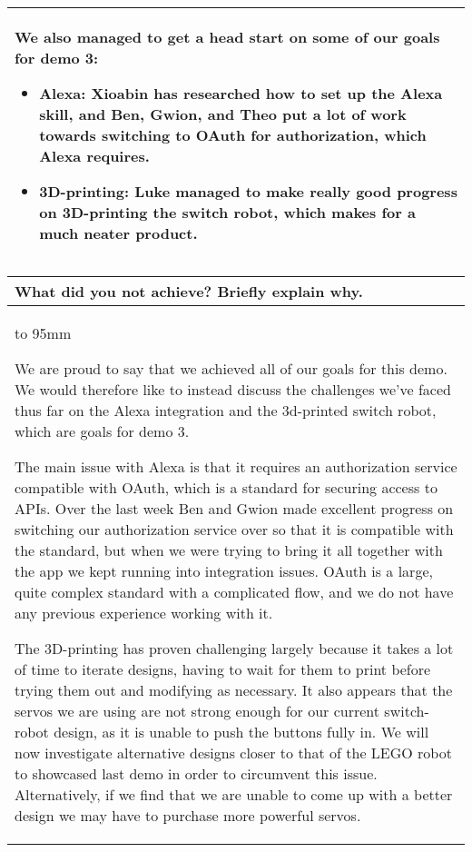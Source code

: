 \documentclass[a4paper]{article}
\newcommand{\colWidth}{141mm}
\begin{document}
\begin{center}
\begin{tabular}{|p{\colWidth}|}
{		We also managed to get a head start on some of our goals for demo 3:
		\begin{itemize}
			\item Alexa: Xioabin has researched how to set up the Alexa skill, and Ben, Gwion, and Theo put a lot of work towards switching to OAuth for authorization, which Alexa requires.
			\item 3D-printing: Luke managed to make really good progress on 3D-printing the switch robot, which makes for a much neater product.
		\end{itemize}
	}
  \\
  \hline
\end{tabular}
\vskip 5mm


\begin{tabular}{|p{\colWidth}|}
	\hline
	\cellcolor{blue!25}\large
	\textbf{What did you not achieve? Briefly explain why.}
	\\ \hline
	\vtop to 95mm{
		We are proud to say that we achieved all of our goals for this demo.
		We would therefore like to instead discuss the challenges we've faced thus far on the Alexa integration and the 3d-printed switch robot, which are goals for demo 3.

		\vspace{2mm}

		The main issue with Alexa is that it requires an authorization service compatible with OAuth, which is a standard for securing access to APIs.
		Over the last week Ben and Gwion made excellent progress on switching our authorization service over so that it is compatible with the standard,
		but when we were trying to bring it all together with the app we kept running into integration issues. OAuth is a large, quite complex standard
		with a complicated flow, and we do not have any previous experience working with it.

		\vspace{2mm}

		The 3D-printing has proven challenging largely because it takes a lot of time to iterate designs, having to wait for them to print before trying them out and modifying as necessary.
		It also appears that the servos we are using are not strong enough for our current switch-robot design, as it is unable to push the buttons fully in.
		We will now investigate alternative designs closer to that of the LEGO robot to showcased last demo in order to circumvent this issue.
		Alternatively, if we find that we are unable to come up with a better design we may have to purchase more powerful servos.
  }
  \\
  \hline
\end{tabular}
\vskip 5mm


\end{center}
\end{document}
